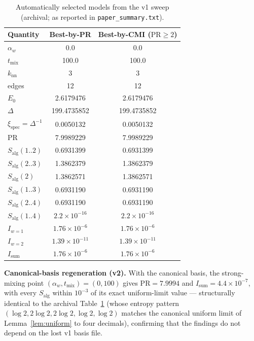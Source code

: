 \documentclass[11pt]{article}
\theoremstyle{remark}
\newcommand{\Salg}{S_{\mathrm{alg}}}
\begin{document}
\begin{table}[H]
\centering
\caption{Automatically selected models from the v1 sweep (archival; as
reported in \texttt{paper\_summary.txt}).}
\label{tab:models}
\begin{tabular}{l c c}
\toprule
Quantity & Best-by-PR & Best-by-CMI ($\mathrm{PR} \ge 2$) \\
\midrule
$\alpha_w$ & 0.0 & 0.0 \\
$t_{\mathrm{mix}}$ & 100.0 & 100.0 \\
$k_{\mathrm{nn}}$ & 3 & 3 \\
edges & 12 & 12 \\
$E_0$ & 2.6179476 & 2.6179476 \\
$\Delta$ & 199.4735852 & 199.4735852 \\
$\xi_{\mathrm{spec}} = \Delta^{-1}$ & 0.0050132 & 0.0050132 \\
PR & 7.9989229 & 7.9989229 \\
$\Salg(1..2)$ & 0.6931399 & 0.6931399 \\
$\Salg(2..3)$ & 1.3862379 & 1.3862379 \\
$\Salg(2)$ & 1.3862571 & 1.3862571 \\
$\Salg(1..3)$ & 0.6931190 & 0.6931190 \\
$\Salg(2..4)$ & 0.6931190 & 0.6931190 \\
$\Salg(1..4)$ & $2.2\times10^{-16}$ & $2.2\times10^{-16}$ \\
$I_{w=1}$ & $1.76\times10^{-6}$ & $1.76\times10^{-6}$ \\
$I_{w=2}$ & $1.39\times10^{-11}$ & $1.39\times10^{-11}$ \\
$I_{\mathrm{sum}}$ & $1.76\times10^{-6}$ & $1.76\times10^{-6}$ \\
\bottomrule
\end{tabular}
\end{table}

\textbf{Canonical-basis regeneration (v2).} With the canonical basis,
the strong-mixing point $(\alpha_w, t_{\mathrm{mix}}) = (0, 100)$ gives
$\mathrm{PR} = 7.9994$ and $I_{\mathrm{sum}} = 4.4\times10^{-7}$, with
every $\Salg$ within $10^{-3}$ of its exact uniform-limit value ---
structurally identical to the archival Table~\ref{tab:models} (whose
entropy pattern $(\log 2, 2\log 2, 2\log 2, \log 2, \log 2)$ matches the
canonical uniform limit of Lemma~\ref{lem:uniform} to four decimals),
confirming that the findings do not depend on the lost v1 basis file.
\end{document}
